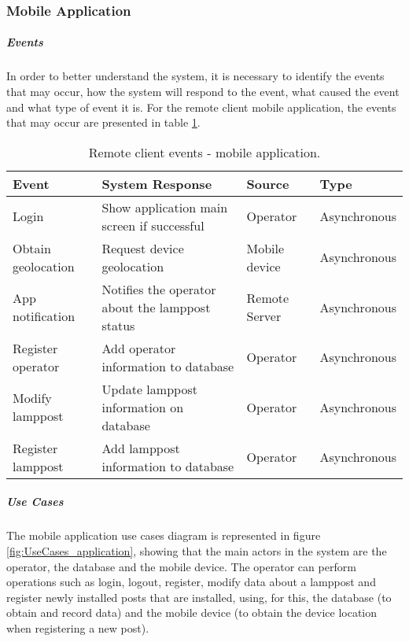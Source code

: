 \subsubsection*{Mobile Application}
\subparagraph*{Events}
In order to better understand the system, it is necessary to identify the events that may occur, how the system will respond to the event, what caused the event and what type of event it is. For the remote client mobile application, the events that may occur are presented in table \ref{table:rc_app_events}.

\begin{table}[ht]
	\centering
	\resizebox{\columnwidth}{!}
	{
		\begin{tabular}{|m{3cm}|m{5cm}|m{2.4cm}|m{2.4cm}|}
			\hline
			\textbf{Event} & \textbf{System Response} & \textbf{Source} & \textbf{Type}\\
			\hline\hline
			Login & Show application main screen if successful & Operator & Asynchronous\\
			\hline
			
			Obtain geolocation & Request device geolocation & Mobile device & Asynchronous\\
			\hline
			
			App notification & Notifies the operator about the lamppost status & Remote Server & Asynchronous\\
			\hline
			
			Register operator & Add operator information to database & Operator & Asynchronous\\
			\hline
			
			Modify lamppost & Update lamppost information on database & Operator & Asynchronous\\
			\hline
			
			Register lamppost & Add lamppost information to database & Operator & Asynchronous\\
			\hline			
		\end{tabular}
	}
	\caption{Remote client events - mobile application.}
	\label{table:rc_app_events}
\end{table}

\subparagraph*{Use Cases}
The mobile application use cases diagram is represented in figure \ref{fig:UseCases_application}, showing that the main actors in the system are the operator, the database and the mobile device. The operator can perform operations such as login, logout, register, modify data about a lamppost and register newly installed posts that are installed, using, for this, the database (to obtain and record data) and the mobile device (to obtain the device location when registering a new post).

